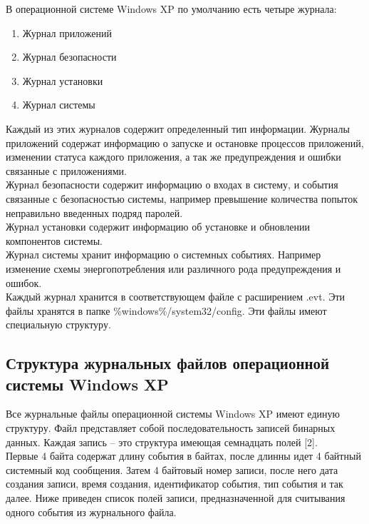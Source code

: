 В операционной системе Windows XP по умолчанию есть четыре журнала:

\begin{enumerate}
\item Журнал приложений
\item Журнал безопасности
\item Журнал установки
\item Журнал системы
\end{enumerate}

Каждый из этих журналов содержит определенный тип информации. Журналы приложений содержат информацию о запуске и остановке процессов приложений, изменении статуса каждого приложения, а так же предупреждения и ошибки связанные с приложениями. \\

Журнал безопасности содержит информацию о входах в систему, и события связанные с безопасностью системы, например превышение количества попыток неправильно введенных подряд паролей. \\

Журнал установки содержит информацию об установке и обновлении компонентов системы. \\

Журнал системы хранит информацию о системных событиях. Например изменение схемы энергопотребления или различного рода предупреждения и ошибок. \\

Каждый журнал хранится в соответствующем файле с расширением .evt. Эти файлы хранятся в папке \%windows\%/system32/config. Эти файлы имеют специальную структуру. \\

\subsection{Структура журнальных файлов операционной системы Windows XP}

Все журнальные файлы операционной системы Windows XP имеют единую структуру. Файл представляет собой последовательность записей бинарных данных. Каждая запись – это структура имеющая семнадцать полей [2]. \\

Первые 4 байта содержат длину события в байтах, после длинны идет 4 байтный системный код сообщения. Затем 4 байтовый номер записи, после него дата создания записи, время создания, идентификатор события, тип события и так далее. Ниже приведен список полей записи, предназначенной для считывания одного события из журнального файла. \\

